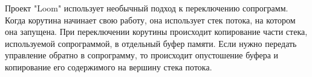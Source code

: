 	\par
	Проект "Loom" использует необычный подход к переключению сопрограмм. Когда корутина начинает свою работу, она использует
	стек потока, на котором она запущена. При переключении корутины происходит копирование части стека, используемой сопрограммой, в отдельный буфер памяти. Если нужно передать управление обратно в сопрограмму, то происходит опустошение буфера и копирование его содержимого на вершину стека потока. 
	
\clearpage